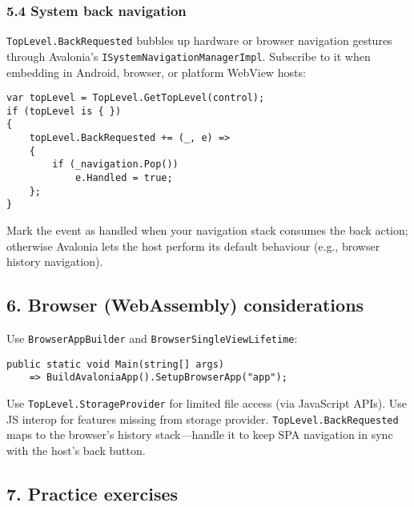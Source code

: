 \subsubsection{5.4 System back navigation}\label{system-back-navigation}

\passthrough{\lstinline!TopLevel.BackRequested!} bubbles up hardware or
browser navigation gestures through Avalonia's
\passthrough{\lstinline!ISystemNavigationManagerImpl!}. Subscribe to it
when embedding in Android, browser, or platform WebView hosts:

\begin{lstlisting}
var topLevel = TopLevel.GetTopLevel(control);
if (topLevel is { })
{
    topLevel.BackRequested += (_, e) =>
    {
        if (_navigation.Pop())
            e.Handled = true;
    };
}
\end{lstlisting}

Mark the event as handled when your navigation stack consumes the back
action; otherwise Avalonia lets the host perform its default behaviour
(e.g., browser history navigation).

\subsection{6. Browser (WebAssembly)
considerations}\label{browser-webassembly-considerations}

Use \passthrough{\lstinline!BrowserAppBuilder!} and
\passthrough{\lstinline!BrowserSingleViewLifetime!}:

\begin{lstlisting}
public static void Main(string[] args)
    => BuildAvaloniaApp().SetupBrowserApp("app");
\end{lstlisting}

Use \passthrough{\lstinline!TopLevel.StorageProvider!} for limited file
access (via JavaScript APIs). Use JS interop for features missing from
storage provider. \passthrough{\lstinline!TopLevel.BackRequested!} maps
to the browser's history stack---handle it to keep SPA navigation in
sync with the host's back button.

\subsection{7. Practice exercises}\label{practice-exercises-6}

